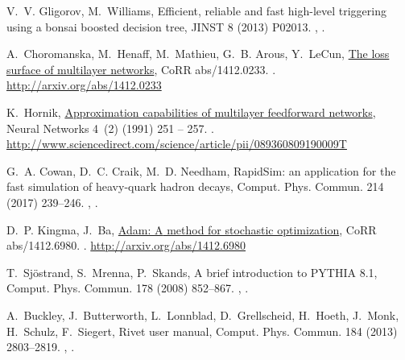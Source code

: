 \documentclass[final,5p,times,twocolumn]{elsarticle}
\begin{document}
\begin{thebibliography}{10}
V.~V. Gligorov, M.~Williams, {Efficient, reliable and fast high-level
  triggering using a bonsai boosted decision tree}, JINST 8 (2013) P02013.
\newblock \href {http://arxiv.org/abs/1210.6861} {},
  \href {http://dx.doi.org/10.1088/1748-0221/8/02/P02013}
  {}.

A.~Choromanska, M.~Henaff, M.~Mathieu, G.~B. Arous, Y.~LeCun,
  \href{http://arxiv.org/abs/1412.0233}{The loss surface of multilayer
  networks}, CoRR abs/1412.0233.
\newblock \href {http://arxiv.org/abs/1412.0233} {}.
\newline\urlprefix\url{http://arxiv.org/abs/1412.0233}

K.~Hornik,
  \href{http://www.sciencedirect.com/science/article/pii/089360809190009T}{Approximation
  capabilities of multilayer feedforward networks}, Neural Networks 4~(2)
  (1991) 251 -- 257.
\newblock \href {http://dx.doi.org/10.1016/0893-6080(91)90009-T}
  {}.
\newline\urlprefix\url{http://www.sciencedirect.com/science/article/pii/089360809190009T}

G.~A. Cowan, D.~C. Craik, M.~D. Needham, {RapidSim: an application for the fast
  simulation of heavy-quark hadron decays}, Comput. Phys. Commun. 214 (2017)
  239--246.
\newblock \href {http://arxiv.org/abs/1612.07489} {},
  \href {http://dx.doi.org/10.1016/j.cpc.2017.01.029}
  {}.

D.~P. Kingma, J.~Ba, \href{http://arxiv.org/abs/1412.6980}{Adam: {A} method for
  stochastic optimization}, CoRR abs/1412.6980.
\newblock \href {http://arxiv.org/abs/1412.6980} {}.
\newline\urlprefix\url{http://arxiv.org/abs/1412.6980}

T.~Sj\"{o}strand, S.~Mrenna, P.~Skands, {A brief introduction to PYTHIA 8.1},
  Comput. Phys. Commun. 178 (2008) 852--867.
\newblock \href {http://arxiv.org/abs/0710.3820} {},
  \href {http://dx.doi.org/10.1016/j.cpc.2008.01.036}
  {}.

A.~Buckley, J.~Butterworth, L.~Lonnblad, D.~Grellscheid, H.~Hoeth, J.~Monk,
  H.~Schulz, F.~Siegert, {Rivet user manual}, Comput. Phys. Commun. 184 (2013)
  2803--2819.
\newblock \href {http://arxiv.org/abs/1003.0694} {},
  \href {http://dx.doi.org/10.1016/j.cpc.2013.05.021}
  {}.


\end{thebibliography}
\end{document}
